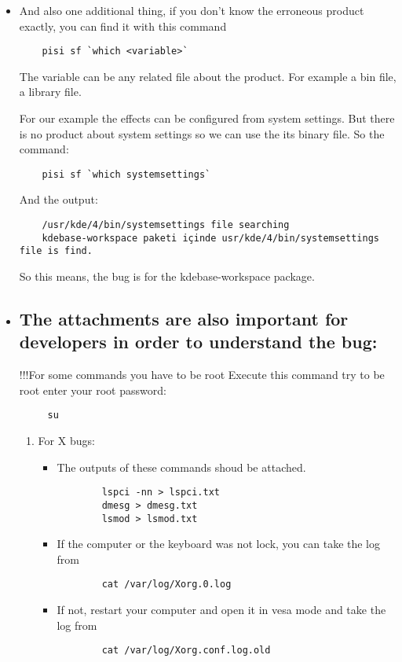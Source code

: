 \documentclass[a4paper,10pt]{article}
\begin{document}
\begin{itemize}
  	\item And also one additional thing, if you don't know the erroneous product exactly, you can find it with this command
	\begin{verbatim}
	pisi sf `which <variable>`
	\end{verbatim}
	The variable can be any related file about the product. For example a bin file, a library file.

	For our example the effects can be configured from system settings. But there is no product about system settings so we can use the its binary file. So the command:
	\begin{verbatim}
	pisi sf `which systemsettings`
	\end{verbatim}

	And the output:
	\begin{verbatim}
	/usr/kde/4/bin/systemsettings file searching
	kdebase-workspace paketi içinde usr/kde/4/bin/systemsettings file is find.
	\end{verbatim}
	So this means, the bug is for the kdebase-workspace package.

  \item \subsection*{The attachments are also important for developers in order to understand the bug:}

	!!!For some commands you have to be root
	Execute this command try to be root enter your root password:
	\begin{verbatim}
	 su
	\end{verbatim}

	\begin{enumerate}
	\item For X bugs:
	\begin{itemize}
		\item The outputs of these commands shoud be attached.
		\begin{verbatim}
		lspci -nn > lspci.txt
		dmesg > dmesg.txt
		lsmod > lsmod.txt
		\end{verbatim}
		\item If the computer or the keyboard was not lock, you can take the log from 
		\begin{verbatim}
		cat /var/log/Xorg.0.log
		\end{verbatim}
		\item If not, restart your computer and open it in vesa mode and take the log from
		\begin{verbatim}
		cat /var/log/Xorg.conf.log.old
		\end{verbatim}


\end{itemize}
\end{enumerate}
\end{itemize}
\end{document}
